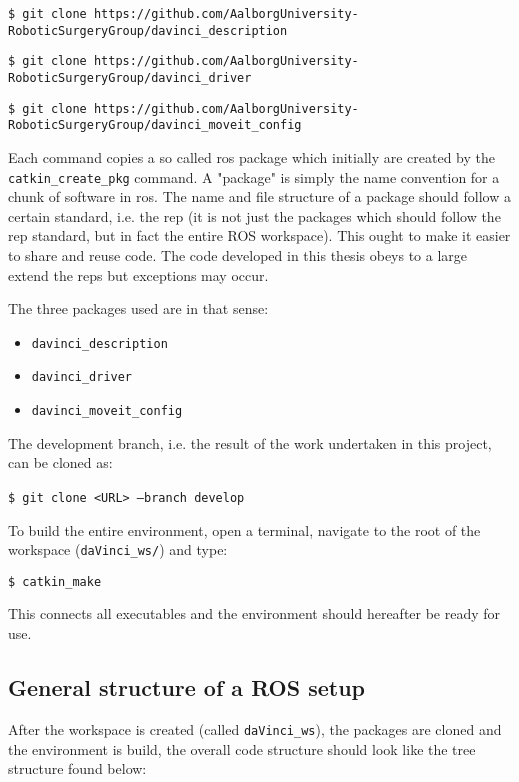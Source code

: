 \hspace{0cm} \texttt{\$ git clone https://github.com/AalborgUniversity-RoboticSurgeryGroup/davinci\_description}

\hspace{0cm} \texttt{\$ git clone https://github.com/AalborgUniversity-RoboticSurgeryGroup/davinci\_driver}

\hspace{0cm} \texttt{\$ git clone https://github.com/AalborgUniversity-RoboticSurgeryGroup/davinci\_moveit\_config}\vspace{0.2cm}

Each command copies a so called \gls{ros} package which initially are created by the \texttt{catkin\_create\_pkg} command. A "package" is simply the name convention for a chunk of software in \gls{ros}. The name and file structure of a package should follow a certain standard, i.e. the \gls{rep} (it is not just the packages which should follow the \gls{rep} standard, but in fact the entire ROS workspace). This ought to make it easier to share and reuse code. The code developed in this thesis obeys to a large extend the \gls{rep}s but exceptions may occur. 

The three packages used are in that sense:
\begin{itemize}
\item \texttt{davinci\_description}
\item \texttt{davinci\_driver}
\item \texttt{davinci\_moveit\_config}
\end{itemize}
The development branch, i.e. the result of the work undertaken in this project, can be cloned as:

\hspace{0cm} \texttt{\$ git clone <URL> ---branch develop} \ \ \ {}


To build the entire environment, open a terminal, navigate to the root of the workspace (\texttt{daVinci\_ws/}) and type:

\hspace{1cm} \texttt{\$ catkin\_make}

This connects all executables and the environment should hereafter be ready for use.
\subsection*{General structure of a ROS setup}
After the workspace is created (called \texttt{daVinci\_ws}), the packages are cloned and the environment is build, the overall code structure should look like the tree structure found below:

